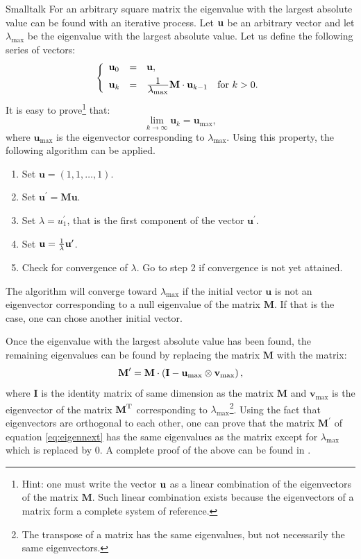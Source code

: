 \begin{displaycode}{Smalltalk}
For an arbitrary square matrix the eigenvalue with the largest
absolute value can be found with an iterative process. Let ${\textbf
u}$ be an arbitrary vector and let $\lambda_{\max}$ be the
eigenvalue with the largest absolute value. Let us define the
following series of vectors:
\begin{equation}
\left\{
  \begin{array}{lcl}
    \textbf{u}_0 &=& \textbf{u}, \\*[1ex]
    \textbf{u}_k &=& {\displaystyle 1\over\displaystyle\lambda_{\max}}\textbf{M}\cdot{\textbf
    u}_{k-1}\mbox{\quad for $k>0$}.
  \end{array}
\right.
\end{equation}
It is easy to prove\footnote{Hint: one must write the vector ${\textbf
u}$ as a linear combination of the eigenvectors of the matrix
$\textbf{M}$. Such linear combination exists because the eigenvectors
of a matrix form a complete system of reference.} that:
\begin{equation}
  \lim_{k\to\infty}\textbf{u}_k=\textbf{u}_{\max},
\end{equation}
where $\textbf{u}_{\max}$ is the eigenvector corresponding to
$\lambda_{\max}$. Using this property, the following algorithm can
be applied.
\begin{enumerate}
  \item Set $\textbf{u}=\left(1,1,\ldots,1\right)$.
  \item Set $\textbf{u}^{\prime}=\textbf{M}\textbf{u}$.
  \item Set $\lambda=u^{\prime}_1$, that is the first component of the
  vector $\textbf{u}^{\prime}$.
  \item Set $\textbf{u}= {1\over\lambda}\textbf{u}^{\prime}$.
  \item Check for convergence of $\lambda$. Go to step 2 if
  convergence is not yet attained.
\end{enumerate}
The algorithm will converge toward $\lambda_{\max}$ if the initial
vector $\textbf{u}$ is not an eigenvector corresponding to a null
eigenvalue of the matrix $\textbf{M}$. If that is the case, one can
chose another initial vector.

Once the eigenvalue with the largest absolute value has been
found, the remaining eigenvalues can be found by replacing the
matrix $\textbf{M}$ with the matrix:
\begin{equation}
\label{eq:eigennext}
  \textbf{M}^{\prime}=\textbf{M}\cdot\left(\textbf{I}-\textbf{u}_{\max}\otimes{\textbf
  v}_{\max}\right),
\end{equation}
where $\textbf{I}$ is the identity matrix of same dimension as the
matrix $\textbf{M}$ and $\textbf{v}_{\max}$ is the eigenvector of the
matrix $\textbf{M}^{\mathop\textrm{T}}$ corresponding to
$\lambda_{\max}$\footnote{The transpose of a matrix has the same
eigenvalues, but not necessarily the same eigenvectors.}. Using
the fact that eigenvectors are orthogonal to each other, one can
prove that the matrix $\textbf{M}^{\prime}$ of equation
\ref{eq:eigennext} has the same eigenvalues as the matrix except
for $\lambda_{\max}$ which is replaced by 0. A complete proof of
the above can be found in \cite{Bass}.


\end{displaycode}
